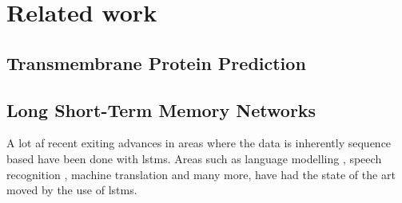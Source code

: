 \section{Related work}
\subsection{Transmembrane Protein Prediction}
% 



\subsection{Long Short-Term Memory Networks}
A lot af recent exiting advances in areas where the data is inherently sequence based 
have been done with \gls{lstms}. Areas such as language modelling \cite{JozefowiczEtAl, ShazeerEtAl},
speech recognition \cite{XiongEtAl}, machine translation \cite{WuEtAl} and many more, have had the 
state of the art moved by the use of \gls{lstms}. 

